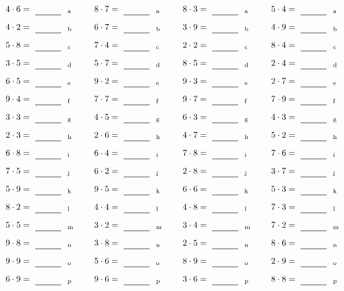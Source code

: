 \documentclass
[
  draft    = true,
  fontsize = 11pt,
  parskip  = half-
]
{scrartcl}
\begin{document}
\par\vfill\par
\begin{align*}
    \pline{4\cdot6}&=\rline{a}
  & \pline{8\cdot7}&=\rline{a}
  & \pline{8\cdot3}&=\rline{a}
  & \pline{5\cdot4}&=\rline{a} \\[1ex]
    \pline{4\cdot2}&=\rline{b}
  & \pline{6\cdot7}&=\rline{b}
  & \pline{3\cdot9}&=\rline{b}
  & \pline{4\cdot9}&=\rline{b} \\[1ex]
    \pline{5\cdot8}&=\rline{c}
  & \pline{7\cdot4}&=\rline{c}
  & \pline{2\cdot2}&=\rline{c}
  & \pline{8\cdot4}&=\rline{c} \\[1ex]
    \pline{3\cdot5}&=\rline{d}
  & \pline{5\cdot7}&=\rline{d}
  & \pline{8\cdot5}&=\rline{d}
  & \pline{2\cdot4}&=\rline{d} \\[1ex]
    \pline{6\cdot5}&=\rline{e}
  & \pline{9\cdot2}&=\rline{e}
  & \pline{9\cdot3}&=\rline{e}
  & \pline{2\cdot7}&=\rline{e} \\[1ex]
    \pline{9\cdot4}&=\rline{f}
  & \pline{7\cdot7}&=\rline{f}
  & \pline{9\cdot7}&=\rline{f}
  & \pline{7\cdot9}&=\rline{f} \\[1ex]
    \pline{3\cdot3}&=\rline{g}
  & \pline{4\cdot5}&=\rline{g}
  & \pline{6\cdot3}&=\rline{g}
  & \pline{4\cdot3}&=\rline{g} \\[1ex]
    \pline{2\cdot3}&=\rline{h}
  & \pline{2\cdot6}&=\rline{h}
  & \pline{4\cdot7}&=\rline{h}
  & \pline{5\cdot2}&=\rline{h} \\[1ex]
    \pline{6\cdot8}&=\rline{i}
  & \pline{6\cdot4}&=\rline{i}
  & \pline{7\cdot8}&=\rline{i}
  & \pline{7\cdot6}&=\rline{i} \\[1ex]
    \pline{7\cdot5}&=\rline{j}
  & \pline{6\cdot2}&=\rline{j}
  & \pline{2\cdot8}&=\rline{j}
  & \pline{3\cdot7}&=\rline{j} \\[1ex]
    \pline{5\cdot9}&=\rline{k}
  & \pline{9\cdot5}&=\rline{k}
  & \pline{6\cdot6}&=\rline{k}
  & \pline{5\cdot3}&=\rline{k} \\[1ex]
    \pline{8\cdot2}&=\rline{l}
  & \pline{4\cdot4}&=\rline{l}
  & \pline{4\cdot8}&=\rline{l}
  & \pline{7\cdot3}&=\rline{l} \\[1ex]
    \pline{5\cdot5}&=\rline{m}
  & \pline{3\cdot2}&=\rline{m}
  & \pline{3\cdot4}&=\rline{m}
  & \pline{7\cdot2}&=\rline{m} \\[1ex]
    \pline{9\cdot8}&=\rline{n}
  & \pline{3\cdot8}&=\rline{n}
  & \pline{2\cdot5}&=\rline{n}
  & \pline{8\cdot6}&=\rline{n} \\[1ex]
    \pline{9\cdot9}&=\rline{o}
  & \pline{5\cdot6}&=\rline{o}
  & \pline{8\cdot9}&=\rline{o}
  & \pline{2\cdot9}&=\rline{o} \\[1ex]
    \pline{6\cdot9}&=\rline{p}
  & \pline{9\cdot6}&=\rline{p}
  & \pline{3\cdot6}&=\rline{p}
  & \pline{8\cdot8}&=\rline{p}
\end{align*}
\end{document}
